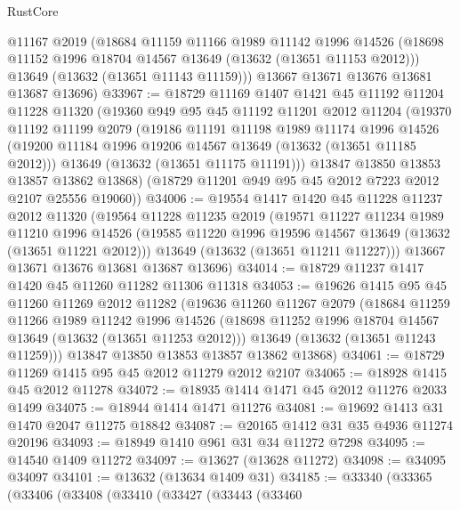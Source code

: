 \begin{lexlean}{RustCore}
\begin{coremodule}
      @11167
      @2019
      (@18684
        @11159
        @11166
        @1989
        @11142
        @1996
        @14526
        (@18698 @11152 @1996 @18704 @14567 @13649 (@13632 (@13651 @11153 @2012)))
        @13649
        (@13632 (@13651 @11143 @11159)))
      @13667
      @13671
      @13676
      @13681
      @13687
      @13696)
@33967 := @18729
    @11169
    @1407
    @1421
    @45
    @11192
    @11204
    @11228
    @11320
    (@19360
      @949
      @95
      @45
      @11192
      @11201
      @2012
      @11204
      (@19370
        @11192
        @11199
        @2079
        (@19186
          @11191
          @11198
          @1989
          @11174
          @1996
          @14526
          (@19200 @11184 @1996 @19206 @14567 @13649 (@13632 (@13651 @11185 @2012)))
          @13649
          (@13632 (@13651 @11175 @11191)))
        @13847
        @13850
        @13853
        @13857
        @13862
        @13868)
      (@18729 @11201 @949 @95 @45 @2012 @7223 @2012 @2107 @25556 @19060))
@34006 := @19554
    @1417
    @1420
    @45
    @11228
    @11237
    @2012
    @11320
    (@19564
      @11228
      @11235
      @2019
      (@19571
        @11227
        @11234
        @1989
        @11210
        @1996
        @14526
        (@19585 @11220 @1996 @19596 @14567 @13649 (@13632 (@13651 @11221 @2012)))
        @13649
        (@13632 (@13651 @11211 @11227)))
      @13667
      @13671
      @13676
      @13681
      @13687
      @13696)
@34014 := @18729 @11237 @1417 @1420 @45 @11260 @11282 @11306 @11318
@34053 := @19626
    @1415
    @95
    @45
    @11260
    @11269
    @2012
    @11282
    (@19636
      @11260
      @11267
      @2079
      (@18684
        @11259
        @11266
        @1989
        @11242
        @1996
        @14526
        (@18698 @11252 @1996 @18704 @14567 @13649 (@13632 (@13651 @11253 @2012)))
        @13649
        (@13632 (@13651 @11243 @11259)))
      @13847
      @13850
      @13853
      @13857
      @13862
      @13868)
@34061 := @18729 @11269 @1415 @95 @45 @2012 @11279 @2012 @2107
@34065 := @18928 @1415 @45 @2012 @11278
@34072 := @18935 @1414 @1471 @45 @2012 @11276 @2033 @1499
@34075 := @18944 @1414 @1471 @11276
@34081 := @19692 @1413 @31 @1470 @2047 @11275 @18842
@34087 := @20165 @1412 @31 @35 @4936 @11274 @20196
@34093 := @18949 @1410 @961 @31 @34 @11272 @7298
@34095 := @14540 @1409 @11272
@34097 := @13627 (@13628 @11272)
@34098 := @34095 @34097
@34101 := @13632 (@13634 @1409 @31)
@34185 := @33340
    (@33365
      (@33406
        (@33408
          (@33410
            (@33427
              (@33443
                (@33460

\end{coremodule}
\end{lexlean}
